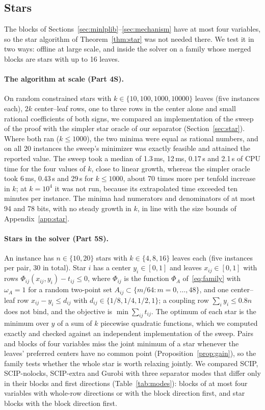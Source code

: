 \subsection{Stars}\label{sec:star-bench}

The blocks of Sections~\ref{sec:minlplib}--\ref{sec:mechanism} have at most four
variables, so the star algorithm of Theorem~\ref{thm:star} was not needed
there. We test it in two ways: offline at large scale, and inside the solver on
a family whose merged blocks are stars with up to 16 leaves.

\paragraph{The algorithm at scale (Part 4S).} On random constrained stars with
$k\in\{10,100,1000,10000\}$ leaves (five instances each), $2k$ center--leaf
rows, one to three rows in the center alone and small rational coefficients of
both signs, we compared an implementation of the sweep of the proof with the
simpler star oracle of our separator (Section~\ref{sec:star}). Where both ran
($k\le1000$), the two minima were equal as rational numbers, and on all 20
instances the sweep's minimizer was exactly feasible and attained the reported
value. The sweep took a median of 1.3\,ms, 12\,ms, 0.17\,s and 2.1\,s of CPU time
for the four values of $k$, close to linear growth, whereas the simpler oracle
took 6\,ms, 0.43\,s and 29\,s for $k\le1000$, about 70 times more per tenfold
increase in $k$; at $k=10^4$ it was not run, because its extrapolated time
exceeded ten minutes per instance. The minima had numerators and denominators
of at most 94 and 78 bits, with no steady growth in $k$, in line with the size
bounds of Appendix~\ref{app:star}.

\paragraph{Stars in the solver (Part 5S).} An instance has $n\in\{10,20\}$
stars with $k\in\{4,8,16\}$ leaves each (five instances per pair, 30 in total).
Star $i$ has a center $y_i\in[0,1]$ and leaves $x_{ij}\in[0,1]$ with rows
$\Phi_{ij}(x_{ij},y_i)-t_{ij}\le0$, where $\Phi_{ij}$ is the function $\Phi_A$
of~\eqref{eq:family} with $\omega_A=1$ for a random two-point set
$A_{ij}\subset\{m/64:m=0,\dots,48\}$, and one center--leaf row
$x_{ij}-y_i\le d_{ij}$ with $d_{ij}\in\{1/8,1/4,1/2,1\}$; a coupling row
$\sum_iy_i\le0.8n$ does not bind, and the objective is $\min\sum_{ij}t_{ij}$.
The optimum of each star is the minimum over $y$ of a sum of $k$ piecewise
quadratic functions, which we computed exactly and checked against an
independent implementation of the sweep. Pairs and blocks of four variables
miss the joint minimum of a star whenever the leaves' preferred centers have no
common point (Proposition~\ref{prop:gain}), so the family tests whether the
whole star is worth relaxing jointly. We compared SCIP, SCIP-nolocks,
SCIP-extra and Gurobi with three separator modes that differ only in their
blocks and first directions (Table~\ref{tab:modes}): blocks of at most four
variables with whole-row directions or with the block direction first, and
star blocks with the block direction first.

